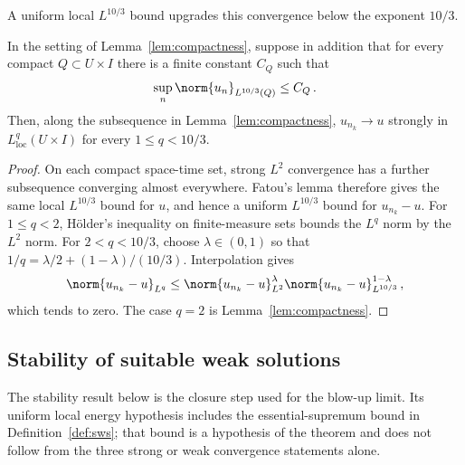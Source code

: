 \documentclass[11pt,reqno]{amsart}
\begin{document}
A uniform local $L^{10/3}$ bound upgrades this convergence below the exponent $10/3$.

\begin{corollary}\label{cor:compactness-Lq}
In the setting of Lemma~\ref{lem:compactness}, suppose in addition that for every compact $Q\subset U\times I$ there is a finite constant $C_Q$ such that
\begin{equation*}
\sup_n\norm{u_n}_{L^{10/3}(Q)}\le C_Q\,.
\end{equation*}
Then, along the subsequence in Lemma~\ref{lem:compactness}, $u_{n_k}\to u$ strongly in $L^q_{\mathrm{loc}}(U\times I)$ for every $1\le q<10/3$.
\end{corollary}

\begin{proof}
On each compact space-time set, strong $L^2$ convergence has a further subsequence converging almost everywhere. Fatou's lemma therefore gives the same local $L^{10/3}$ bound for $u$, and hence a uniform $L^{10/3}$ bound for $u_{n_k}-u$. For $1\le q<2$, H\"older's inequality on finite-measure sets bounds the $L^q$ norm by the $L^2$ norm. For $2<q<10/3$, choose $\lambda\in(0,1)$ so that $1/q=\lambda/2+(1-\lambda)/(10/3)$. Interpolation gives
\begin{equation*}
\norm{u_{n_k}-u}_{L^q}\le
\norm{u_{n_k}-u}_{L^2}^{\lambda}
\norm{u_{n_k}-u}_{L^{10/3}}^{1-\lambda}\,,
\end{equation*}
which tends to zero. The case $q=2$ is Lemma~\ref{lem:compactness}.
\end{proof}

\subsection{Stability of suitable weak solutions}\label{subsec:stability}

The stability result below is the closure step used for the blow-up limit. Its
uniform local energy hypothesis includes the essential-supremum bound in
Definition~\ref{def:sws}; that bound is a hypothesis of the theorem and does
not follow from the three strong or weak convergence statements alone.
\end{document}
